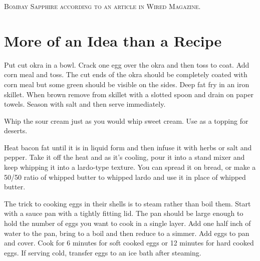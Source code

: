 \documentclass[letterpaper]{recipePMG}
\begin{document}


\textsc{Bombay Sapphire according to an article in Wired Magazine.}

\chapter{  More of an Idea than a Recipe}



Put cut okra in a bowl. Crack one egg over the okra and then toss to coat. Add corn meal and toss.  The cut ends of the okra should be completely coated with corn meal but some green should be visible on the sides. Deep fat fry in an iron skillet. When brown remove from skillet with a slotted spoon and drain on paper towels. Season with salt and then serve immediately.



Whip the sour cream just as you would whip sweet cream.  Use as a topping for deserts.



Heat bacon fat until it is in liquid form and then infuse it with herbs or salt and pepper. Take it off the heat and as it's cooling, pour it into a stand mixer and keep whipping it into a lardo-type texture. You can spread it on bread, or make a 50/50 ratio of whipped butter to whipped lardo and use it in place of whipped butter.



The trick to cooking eggs in their shells is to steam rather than boil them. Start with a sauce pan with a tightly fitting lid. The pan should be large enough to hold the number of eggs you want to cook in a single layer.  Add one half inch of water to the pan, bring to a boil and then reduce to a simmer.  Add eggs to pan and cover.  Cook for 6 minutes for soft cooked eggs or 12 minutes for hard cooked eggs. If serving cold, transfer eggs to an ice bath after steaming.
\end{document}
